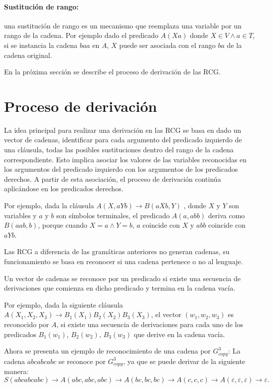 
\paragraph{Sustitución de rango:} una sustitución de rango es un mecanismo que reemplaza una
variable por un rango de la cadena. Por ejemplo dado el predicado $A(Xa)$ donde $X \in V \wedge a \in T$,
si se instancia la cadena $baa$ en $A$, $X$ puede ser asociada con el rango $ba$ de la cadena original.

En la próxima sección se describe el proceso de derivación de las RCG.
\section{Proceso de derivación}

La idea principal para realizar una derivación en las RCG se basa en dado un vector de cadenas, identificar para cada argumento del
predicado izquierdo de una cláusula, todas las posibles sustituciones dentro del rango de la cadena correspondiente.
Esto implica asociar los valores de las variables reconocidas en los argumentos del predicado izquierdo con los
argumentos de los predicados derechos. A partir de esta asociación, el proceso de derivación continúa
aplicándose en los predicados derechos.

Por ejemplo, dada la cláusula $A(X,aYb)\to B(aXb,Y)$ , donde $X$ y $Y$ son variables y $a$ y $b$ son
símbolos terminales, el predicado $A(a,abb)$ deriva como $B(aab,b)$, porque cuando $ X=a \wedge Y=b$,
$a$ coincide con $X$ y $abb$ coincide con $aYb$.

Las RCG a diferencia de las gramáticas anteriores no generan cadenas, su funcionamiento se basa en reconocer si
una cadena pertenece o no al lenguaje.

Un vector de cadenas se reconoce por un predicado si existe una secuencia de derivaciones
que comienza en dicho predicado y termina en la cadena vacía.

Por ejemplo, dada la siguiente cláusula $A(X_1,X_2,X_3)\to B_1(X_1)B_2(X_2)B_3(X_3)$, el vector $(w_1,w_2,w_3)$ es reconocido
por $A$, si existe una secuencia de derivaciones para cada
uno de los predicados $B_1(w_1)$, $B_2(w_2)$, $B_3(w_3)$ que derive en la cadena vacía.

Ahora se presenta un ejemplo de reconocimiento de una cadena por $G^3_{copy}$: La cadena $abcabcabc$ se reconoce por $G^3_{copy}$, ya que se puede derivar de la siguiente manera:
$$S(abcabcabc)\to A(abc,abc,abc)\to A(bc,bc,bc)\to A(c,c,c)\to A(\varepsilon,\varepsilon,\varepsilon)\to \varepsilon.$$

